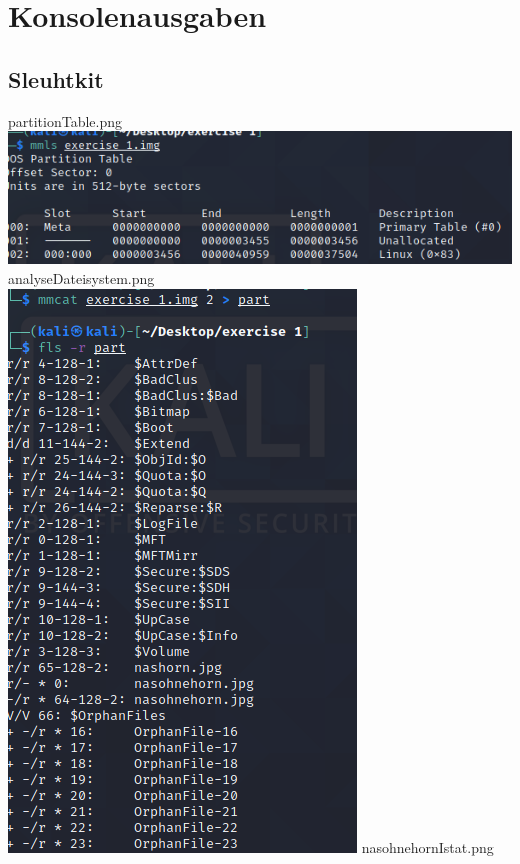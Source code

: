 \chapter{Konsolenausgaben}


\section{Sleuhtkit}

partitionTable.png\\
\includegraphics[scale=0.6]{bilder/partition_table.png } \\
analyseDateisystem.png\\
\includegraphics[scale=0.6]{bilder/analyse_Dateisystem.png } \newpage
nasohnehornIstat.png\\

